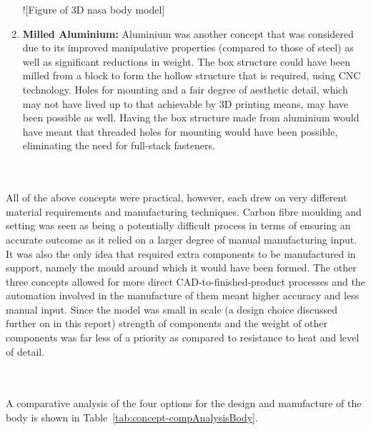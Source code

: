 \begin{enumerate}
        ![Figure of 3D nasa body model]
        
        \item \textbf{Milled Aluminium:} Aluminium was another concept that was considered due to its improved manipulative properties (compared to those of steel) as well as significant reductions in weight. The box structure could have been milled from a block to form the hollow structure that is required, using CNC technology. Holes for mounting and a fair degree of aesthetic detail, which may not have lived up to that achievable by 3D printing means, may have been possible as well. Having the box structure made from aluminium would have meant that threaded holes for mounting would have been possible, eliminating the need for full-stack fasteners.
      \end{enumerate}
      
      \\\\
      All of the above concepts were practical, however, each drew on very different material requirements and manufacturing techniques. Carbon fibre moulding and setting was seen as being a potentially difficult process in terms of ensuring an accurate outcome as it relied on a larger degree of manual manufacturing input. It was also the only idea that required extra components to be manufactured in support, namely the mould around which it would have been formed. The other three concepts allowed for more direct CAD-to-finished-product processes and the automation involved in the manufacture of them meant higher accuracy and less manual input. Since the model was small in scale (a design choice discussed further on in this report) strength of components and the weight of other components was far less of a priority as compared to resistance to heat and level of detail.
      
      \\\\
      A comparative analysis of the four options for the design and manufacture of the body is shown in Table~\ref{tab:concept-compAnalysisBody}.
      
